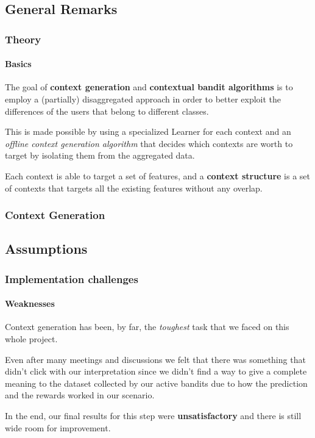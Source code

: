 
\subsection{General Remarks}


\begin{frame}

\frametitle{Theory}
\framesubtitle{Basics}

The goal of \textbf{context generation} and \textbf{contextual bandit algorithms} is to employ a (partially) disaggregated approach in order to better exploit the differences of the users that belong to different classes.

This is made possible by using a specialized Learner for each context and an \textit{offline context generation algorithm} that decides which contexts are worth to target by isolating them from the aggregated data.

Each context is able to target a set of features, and a \textbf{context structure} is a set of contexts that targets all the existing features without any overlap.

\end{frame}


\begin{frame}

\frametitle{Context Generation}
\framesubtitle{}


\end{frame}


\subsection{Assumptions}


\begin{frame}

\frametitle{Implementation challenges}
\framesubtitle{Weaknesses}

Context generation has been, by far, the \textit{toughest} task that we faced on this whole project.

Even after many meetings and discussions we felt that there was something that didn't click with our interpretation since we didn't find a way to give a complete meaning to the dataset collected by our active bandits due to how the prediction and the rewards worked in our scenario.

In the end, our final results for this step were \textbf{unsatisfactory} and there is still wide room for improvement.

\end{frame}


